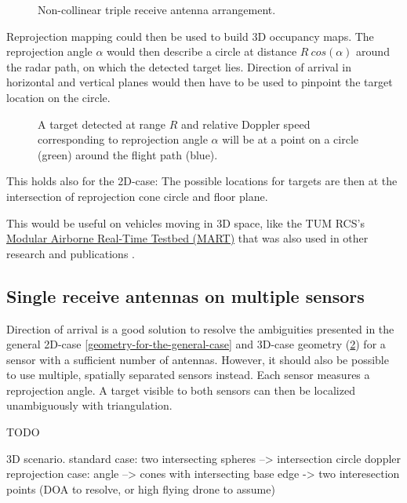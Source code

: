 \begin{figure}[htp]
    \centering
    \def\svgwidth{5cm}
    
    \caption{\label{fig:2ddoa}Non-collinear triple receive antenna arrangement.}
\end{figure}

Reprojection mapping could then be used to build 3D occupancy maps. The
reprojection angle \(\alpha\) would then describe a circle at distance
\(R~cos(\alpha)\) around the radar path, on which the detected target
lies. Direction of arrival in horizontal and vertical planes would then
have to be used to pinpoint the target location on the circle.

\begin{figure}[htp]
    \centering
    \def\svgwidth{5cm}
    
    \caption{\label{fig:3dcase}A target detected at range \(R\) and relative Doppler speed corresponding to reprojection angle \(\alpha\) will be at a point on a circle (green) around the flight path (blue).}
\end{figure}

This holds also for the 2D-case: The possible locations for targets are
then at the intersection of reprojection cone circle and floor plane.

This would be useful on vehicles moving in 3D space, like the TUM RCS's
\href{https://www.rcs.ei.tum.de/forschung/mart/}{Modular Airborne
Real-Time Testbed (MART)} that was also used in other research and
publications \cite{Becker2015}.

\subsection{Single receive antennas on multiple sensors}\label{single-receive-antennas-on-multiple-sensors}

Direction of arrival is a good solution to resolve the ambiguities
presented in the general 2D-case \cref{geometry-for-the-general-case} and 3D-case geometry (\cref{fig:3dcase}) for a
sensor with a sufficient number of antennas. However, it should also be
possible to use multiple, spatially separated sensors instead. Each
sensor measures a reprojection angle. A target visible to both sensors
can then be localized unambiguously with triangulation.

TODO

3D scenario. standard case: two intersecting spheres --\textgreater{}
intersection circle doppler reprojection case: angle --\textgreater{}
cones with intersecting base edge -\textgreater{} two interesection
points (DOA to resolve, or high flying drone to assume)

